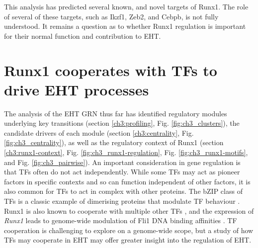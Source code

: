This analysis has predicted several known, and novel targets of Runx1. The role of several of these targets, such as Ikzf1, Zeb2, and Cebpb, is not fully understood. It remains a question as to whether Runx1 regulation is important for their normal function and contribution to EHT.

\section{\label{ch3:co-interaction}Runx1 cooperates with TFs to drive EHT processes}

The analysis of the EHT GRN thus far has identified regulatory modules underlying key transitions (section \ref{ch3:profiling}, Fig. \ref{fig:ch3_clusters}), the candidate drivers of each module (section \ref{ch3:centrality}, Fig. \ref{fig:ch3_centrality}), as well as the regulatory context of Runx1 (section \ref{ch3:runx1-context}, Fig. \ref{fig:ch3_runx1-regulation}, Fig. \ref{fig:ch3_runx1-motifs}, and Fig. \ref{fig:ch3_pairwise}). An important consideration in gene regulation is that TFs often do not act independently. While some TFs may act as pioneer factors in specific contexts \citep{zaret_pioneer_2016, zaret_pioneer_2020} and so can function independent of other factors, it is also common for TFs to act in complex with other proteins. The bZIP class of TFs is a classic example of dimerising proteins that modulate TF behaviour \citep{rodriguez-martinez_combinatorial_2017, miller_importance_2009}. Runx1 is also known to cooperate with multiple other TFs \citep{wang_intersection_2011, zaidi_integration_2002, hu_runx1_2011, kim_mutual_1999, goetz_auto-inhibition_2000}, and the expression of \textit{Runx1} leads to genome-wide modulation of Fli1 DNA binding affinities \citep{lichtinger_runx1_2012}. TF cooperation is challenging to explore on a genome-wide scope, but a study of how TFs may cooperate in EHT may offer greater insight into the regulation of EHT. 

